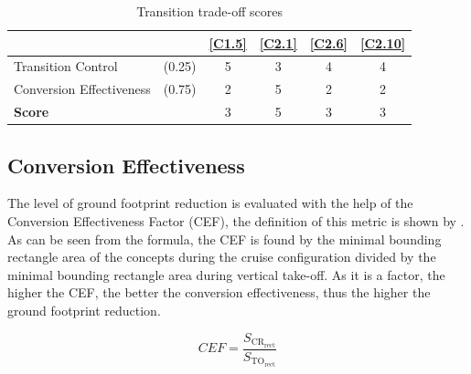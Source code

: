 \begin{table}[ht]
    \centering
    \caption{Transition trade-off scores}
    \label{tab:trade-off_Transition}
    \begin{tabular}{lr|cccc}
        \toprule
                        &     &\textbf{\ref{C1.5}} &\textbf{\ref{C2.1}} &\textbf{\ref{C2.6}} &\textbf{\ref{C2.10}} \\ \bottomrule
    Transition Control &(0.25)& \cellcolor[HTML]{63BE7B}5    & \cellcolor[HTML]{E0E383}3   & \cellcolor[HTML]{A2D07F}4   & \cellcolor[HTML]{A2D07F}4   \\
    Conversion Effectiveness &(0.75)& \cellcolor[HTML]{FCBF7B}2  & \cellcolor[HTML]{63BE7B}5             & \cellcolor[HTML]{FCBF7B}2     & \cellcolor[HTML]{FCBF7B}2                  \\ \hline
    \textbf{Score}      &        & \cellcolor[HTML]{E0E383}3 & \cellcolor[HTML]{63BE7B}5 & \cellcolor[HTML]{E0E383}3 & \cellcolor[HTML]{E0E383}3 \\ \toprule
    \end{tabular}
\end{table}

\subsection{Conversion Effectiveness}
\label{subsec:trade-off_Conversion_Effectiveness}
The level of ground footprint reduction is evaluated with the help of the Conversion Effectiveness Factor (CEF), the definition of this metric is shown by .
As can be seen from the formula, the CEF is found by the minimal bounding rectangle area of the concepts during the cruise configuration divided by the minimal bounding rectangle area during vertical take-off.
As it is a factor, the higher the CEF, the better the conversion effectiveness, thus the higher the ground footprint reduction.

\begin{equation}
    \label{eq:trans_eff}
        CEF = \frac{S_{\text{CR}_{\text{rect}}}}{S_{\text{TO}_{\text{rect}}}}
    \end{equation}
    
